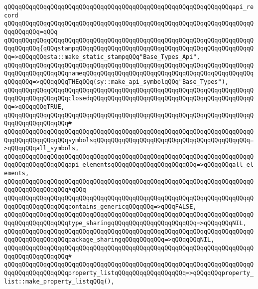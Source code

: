 \newline
\verb|qQQqqQQqqQQqqQQqqQQqqQQqqQQqqQQqqQQqqQQqqQQqqQQqqQQqqQQqqQQqqQQqapi_record|\newline
\verb|qQQqqQQqqQQqqQQqqQQqqQQqqQQqqQQqqQQqqQQqqQQqqQQqqQQqqQQqqQQqqQQqqQQqqQQqqQQqqQQq=qQQq|\newline
\verb|qQQqqQQqqQQqqQQqqQQqqQQqqQQqqQQqqQQqqQQqqQQqqQQqqQQqqQQqqQQqqQQqqQQqqQQqqQQqqQQq{qQQqstampqQQqqQQqqQQqqQQqqQQqqQQqqQQqqQQqqQQqqQQqqQQqqQQqqQQq=>qQQqqQQqsta::make_static_stampqQQq"Base_Types_Api",|\newline
\verb|qQQqqQQqqQQqqQQqqQQqqQQqqQQqqQQqqQQqqQQqqQQqqQQqqQQqqQQqqQQqqQQqqQQqqQQqqQQqqQQqqQQqqQQqnameqQQqqQQqqQQqqQQqqQQqqQQqqQQqqQQqqQQqqQQqqQQqqQQqqQQqqQQq=>qQQqqQQqTHEqQQq(sy::make_api_symbolqQQq"Base_Types"),|\newline
\verb|qQQqqQQqqQQqqQQqqQQqqQQqqQQqqQQqqQQqqQQqqQQqqQQqqQQqqQQqqQQqqQQqqQQqqQQqqQQqqQQqqQQqqQQqclosedqQQqqQQqqQQqqQQqqQQqqQQqqQQqqQQqqQQqqQQqqQQqqQQq=>qQQqqQQqTRUE,|\newline
\verb|qQQqqQQqqQQqqQQqqQQqqQQqqQQqqQQqqQQqqQQqqQQqqQQqqQQqqQQqqQQqqQQqqQQqqQQqqQQqqQQqqQQqqQQq#|\newline
\verb|qQQqqQQqqQQqqQQqqQQqqQQqqQQqqQQqqQQqqQQqqQQqqQQqqQQqqQQqqQQqqQQqqQQqqQQqqQQqqQQqqQQqqQQqsymbolsqQQqqQQqqQQqqQQqqQQqqQQqqQQqqQQqqQQqqQQqqQQq=>qQQqqQQqall_symbols,|\newline
\verb|qQQqqQQqqQQqqQQqqQQqqQQqqQQqqQQqqQQqqQQqqQQqqQQqqQQqqQQqqQQqqQQqqQQqqQQqqQQqqQQqqQQqqQQqapi_elementsqQQqqQQqqQQqqQQqqQQqqQQq=>qQQqqQQqall_elements,|\newline
\verb|qQQqqQQqqQQqqQQqqQQqqQQqqQQqqQQqqQQqqQQqqQQqqQQqqQQqqQQqqQQqqQQqqQQqqQQqqQQqqQQqqQQqqQQq#qQQq|\newline
\verb|qQQqqQQqqQQqqQQqqQQqqQQqqQQqqQQqqQQqqQQqqQQqqQQqqQQqqQQqqQQqqQQqqQQqqQQqqQQqqQQqqQQqqQQqcontains_genericqQQqqQQq=>qQQqFALSE,|\newline
\verb|qQQqqQQqqQQqqQQqqQQqqQQqqQQqqQQqqQQqqQQqqQQqqQQqqQQqqQQqqQQqqQQqqQQqqQQqqQQqqQQqqQQqqQQqtype_sharingqQQqqQQqqQQqqQQqqQQqqQQq=>qQQqqQQqNIL,|\newline
\verb|qQQqqQQqqQQqqQQqqQQqqQQqqQQqqQQqqQQqqQQqqQQqqQQqqQQqqQQqqQQqqQQqqQQqqQQqqQQqqQQqqQQqqQQqpackage_sharingqQQqqQQqqQQq=>qQQqqQQqNIL,|\newline
\verb|qQQqqQQqqQQqqQQqqQQqqQQqqQQqqQQqqQQqqQQqqQQqqQQqqQQqqQQqqQQqqQQqqQQqqQQqqQQqqQQqqQQqqQQq#|\newline
\verb|qQQqqQQqqQQqqQQqqQQqqQQqqQQqqQQqqQQqqQQqqQQqqQQqqQQqqQQqqQQqqQQqqQQqqQQqqQQqqQQqqQQqqQQqproperty_listqQQqqQQqqQQqqQQqqQQq=>qQQqqQQqproperty_list::make_property_listqQQq(),|\newline
